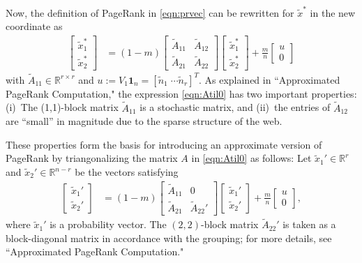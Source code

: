 \documentclass[11pt,draftcls,onecolumn]{IEEEtran}
\newcommand{\field}[1]{{\mathbb{#1}}}
\newcommand{\one}{\mathbf{1}}
\newcommand{\R}{\field{R}}
\begin{document}
Now, the definition of PageRank in \eqref{eqn:prvec} can 
be rewritten for $\widetilde{x}^*$ in the new coordinate as
\begin{align}
 \begin{bmatrix}
   \widetilde{x}_1^*\\
   \widetilde{x}_2^*
 \end{bmatrix}
  &= (1-m)\begin{bmatrix}
             \widetilde{A}_{11} & \widetilde{A}_{12}\\
             \widetilde{A}_{21} & \widetilde{A}_{22}
          \end{bmatrix}
           \begin{bmatrix}
             \widetilde{x}_1^*\\
             \widetilde{x}_2^*
           \end{bmatrix}
      + \frac{m}{n}
           \begin{bmatrix}
             u\\
             0
           \end{bmatrix}
  \label{eqn:Atil0}
\end{align}
with $\widetilde{A}_{11}\in\R^{r\times r}$ and
$u:=V_1\one_n=[\widetilde{n}_1\;\cdots\widetilde{n}_r]^T$.
As explained in ``Approximated PageRank Computation,"
the expression \eqref{eqn:Atil0} has two 
important properties: (i)~The (1,1)-block matrix $\widetilde{A}_{11}$ is 
a stochastic matrix, and (ii)~the entries of $\widetilde{A}_{12}$ are
``small'' in magnitude due to the sparse structure of the web. 

These properties form the basis for introducing an approximate version of
PageRank by triangonalizing the matrix $A$ in \eqref{eqn:Atil0} as follows: 
Let $\widetilde{x}_1'\in\R^{r}$ and $\widetilde{x}_2'\in\R^{n-r}$ be
the vectors satisfying 
\begin{align}
 \begin{bmatrix}
   \widetilde{x}_1'\\
   \widetilde{x}_2'
 \end{bmatrix}
  &= (1-m)\begin{bmatrix}
             \widetilde{A}_{11} & 0\\
             \widetilde{A}_{21} & \widetilde{A}_{22}'
          \end{bmatrix}
           \begin{bmatrix}
             \widetilde{x}_1'\\
             \widetilde{x}_2'
           \end{bmatrix}
      + \frac{m}{n}
           \begin{bmatrix}
             u\\
             0
           \end{bmatrix},
  \label{eqn:Atil0dash}
\end{align}
where $\widetilde{x}_1'$ is a probability vector.
The $(2,2)$-block matrix $\widetilde{A}_{22}'$
is taken as a block-diagonal matrix in accordance with the grouping;
for more details, see ``Approximated PageRank Computation."
\end{document}
